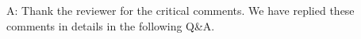 \documentclass[utf8]{article}
\newenvironment{ans}  
    {\color{Black}\noindent A:}
    {~\newline}
\newcommand{\revise}[3]{
	\newline
	\newline
    \noindent
    \textbf{Line #1:}
    \newline
    Original:\newline
    \textit{"#2"}
    \newline
    \newline
    Revised:\newline
    \textit{"#3"}\newline}
\begin{document}
    
    	\begin{ans}
    		Thank the reviewer for the critical comments. We have replied these comments in details in the following Q\&A. 
%    			
%    			
%    			
%    			
%    			

\end{ans}
\end{document}

